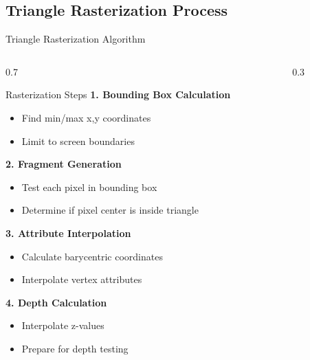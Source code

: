 \subsection{Triangle Rasterization Process}
\begin{frame}{Triangle Rasterization Algorithm}
  \begin{columns}
    \small

    \begin{column}{0.7\textwidth}
      \begin{conceptbox}{Rasterization Steps}
        \textbf{1. Bounding Box Calculation}
        \begin{itemize}
          \item Find min/max x,y coordinates
          \item Limit to screen boundaries
        \end{itemize}

        \textbf{2. Fragment Generation}
        \begin{itemize}
          \item Test each pixel in bounding box
          \item Determine if pixel center is inside triangle
        \end{itemize}

        \textbf{3. Attribute Interpolation}
        \begin{itemize}
          \item Calculate barycentric coordinates
          \item Interpolate vertex attributes
        \end{itemize}

        \textbf{4. Depth Calculation}
        \begin{itemize}
          \item Interpolate z-values
          \item Prepare for depth testing
        \end{itemize}
      \end{conceptbox}
    \end{column}
    \begin{column}{0.3\textwidth}
\end{column}
\end{columns}
\end{frame}
